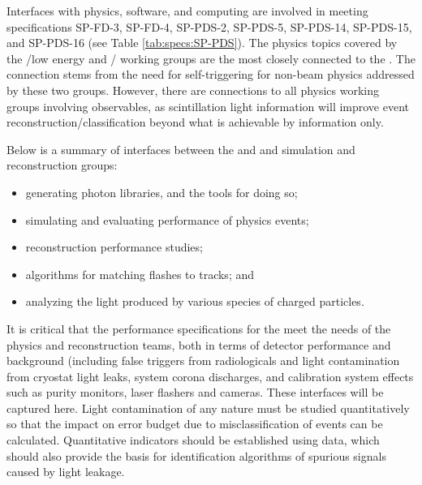 
Interfaces with physics, software, and computing are involved in meeting specifications SP-FD-3, SP-FD-4, SP-PDS-2, SP-PDS-5, 
SP-PDS-14, SP-PDS-15, and SP-PDS-16 (see Table \ref{tab:specs:SP-PDS}). The physics topics covered by the
/low energy and / working groups are the most closely connected to the \single {}. The connection stems from the need for self-triggering for  non-beam physics addressed by these two groups. 
However, there are connections to all physics working groups involving  observables, as scintillation light information will improve event reconstruction/classification beyond what is achievable by  information only. 

Below is a summary of interfaces between the   and  and  simulation and reconstruction groups:

\begin{itemize}
    \item generating photon libraries, and the tools for doing so;
    \item simulating and evaluating performance of physics events;
    \item \single {} reconstruction performance studies;
    \item algorithms for matching flashes to  tracks; and
    \item analyzing the light produced by various species of charged particles.
\end{itemize}

It is critical that the performance specifications for the  meet the needs of the physics and reconstruction teams, both in terms of detector performance and background (including false triggers from radiologicals and light contamination from cryostat light leaks,  system corona discharges, and calibration system effects such as purity monitors, laser flashers and cameras.  These interfaces will be captured here.
Light contamination of any nature must be studied quantitatively so that the impact on error budget due to misclassification of events can be calculated. Quantitative indicators should be established using  data, which should also provide the basis for identification algorithms of spurious signals caused by light leakage. 

